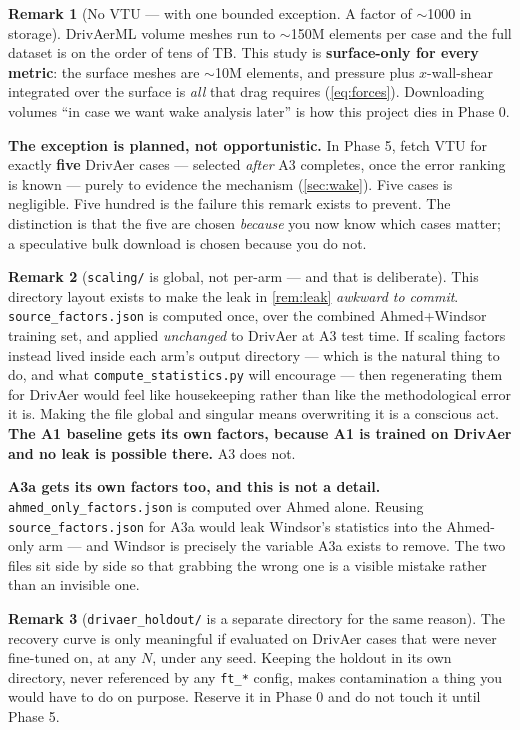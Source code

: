 \documentclass[10pt,a4paper]{article}
\theoremstyle{definition}
\newtheorem{remark}{Remark}[section]
\begin{document}
\begin{remark}[No VTU --- with one bounded exception. A factor of $\sim$1000 in storage]
\label{rem:novtu}
DrivAerML volume meshes run to $\sim$150M elements per case and the full dataset is on
the order of tens of TB. This study is \textbf{surface-only for every metric}: the
surface meshes are $\sim$10M elements, and pressure plus $x$-wall-shear integrated over
the surface is \emph{all} that drag requires (\cref{eq:forces}). Downloading volumes
``in case we want wake analysis later'' is how this project dies in Phase 0.

\textbf{The exception is planned, not opportunistic.} In Phase 5, fetch VTU for exactly
\textbf{five} DrivAer cases --- selected \emph{after} A3 completes, once the error
ranking is known --- purely to evidence the mechanism (\cref{sec:wake}). Five cases is
negligible. Five hundred is the failure this remark exists to prevent. The distinction
is that the five are chosen \emph{because} you now know which cases matter; a
speculative bulk download is chosen because you do not.
\end{remark}

\begin{remark}[\texttt{scaling/} is global, not per-arm --- and that is deliberate]
\label{rem:scalingpath}
This directory layout exists to make the leak in \cref{rem:leak} \emph{awkward to
commit}. \texttt{source\_factors.json} is computed once, over the combined
Ahmed+Windsor training set, and applied \emph{unchanged} to DrivAer at A3 test time.
If scaling factors instead lived inside each arm's output directory --- which is the
natural thing to do, and what \texttt{compute\_statistics.py} will encourage --- then
regenerating them for DrivAer would feel like housekeeping rather than like the
methodological error it is. Making the file global and singular means overwriting it is
a conscious act. \textbf{The A1 baseline gets its own factors, because A1 is trained on
DrivAer and no leak is possible there.} A3 does not.

\textbf{A3a gets its own factors too, and this is not a detail.}
\texttt{ahmed\_only\_factors.json} is computed over Ahmed alone. Reusing
\texttt{source\_factors.json} for A3a would leak Windsor's statistics into the
Ahmed-only arm --- and Windsor is precisely the variable A3a exists to remove. The two
files sit side by side so that grabbing the wrong one is a visible mistake rather than
an invisible one.
\end{remark}

\begin{remark}[\texttt{drivaer\_holdout/} is a separate directory for the same reason]
The recovery curve is only meaningful if evaluated on DrivAer cases that were never
fine-tuned on, at any $N$, under any seed. Keeping the holdout in its own directory,
never referenced by any \texttt{ft\_*} config, makes contamination a thing you would
have to do on purpose. Reserve it in Phase 0 and do not touch it until Phase 5.
\end{remark}
\end{document}
